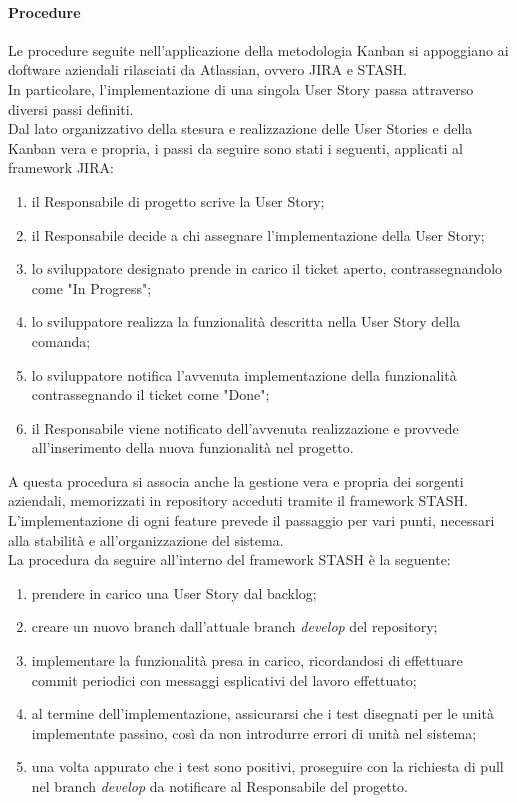 \paragraph{Procedure}
Le procedure seguite nell'applicazione della metodologia Kanban si appoggiano ai doftware aziendali rilasciati da Atlassian, ovvero JIRA e STASH.\\
In particolare, l'implementazione di una singola User Story passa attraverso diversi passi definiti.\\
Dal lato organizzativo della stesura e realizzazione delle User Stories e della Kanban vera e propria, i passi da seguire sono stati i seguenti, applicati al framework JIRA:
\begin{enumerate}
	\item il Responsabile di progetto scrive la User Story;
	\item il Responsabile decide a chi assegnare l'implementazione della User Story;
	\item lo sviluppatore designato prende in carico il ticket aperto, contrassegnandolo come "In Progress";
	\item lo sviluppatore realizza la funzionalità descritta nella User Story della comanda;
	\item lo sviluppatore notifica l'avvenuta implementazione della funzionalità contrassegnando il ticket come "Done";
	\item il Responsabile viene notificato dell'avvenuta realizzazione e provvede all'inserimento della nuova funzionalità nel progetto.
\end{enumerate}
A questa procedura si associa anche la gestione vera e propria dei sorgenti aziendali, memorizzati in repository acceduti tramite il framework STASH. L'implementazione di ogni feature prevede il passaggio per vari punti, necessari alla stabilità e all'organizzazione del sistema.\\
La procedura da seguire all'interno del framework STASH è la seguente:
\begin{enumerate}
	\item prendere in carico una User Story dal backlog;
	\item creare un nuovo branch dall'attuale branch \emph{develop} del repository;
	\item implementare la funzionalità presa in carico, ricordandosi di effettuare commit periodici con messaggi esplicativi del lavoro effettuato;
	\item al termine dell'implementazione, assicurarsi che i test disegnati per le unità implementate passino, così da non introdurre errori di unità nel sistema;
	\item una volta appurato che i test sono positivi, proseguire con la richiesta di pull nel branch \emph{develop} da notificare al Responsabile del progetto.
\end{enumerate}
